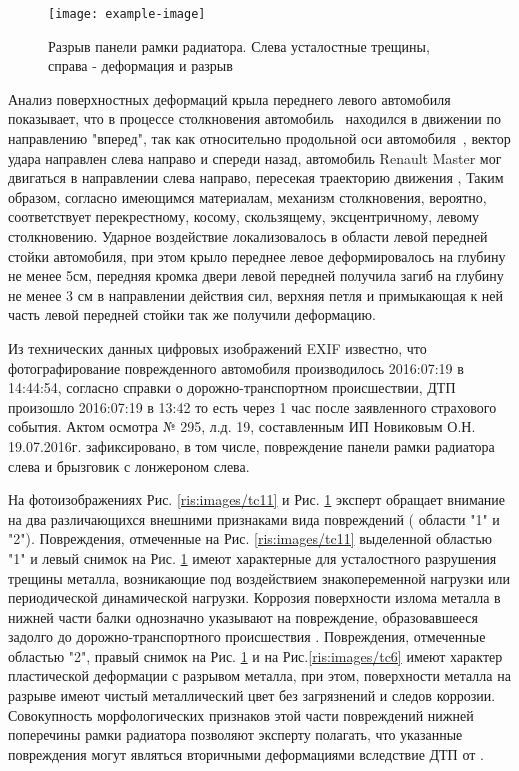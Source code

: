 \begin{figure}[H]
	\centering
	\texttt{[image: example-image]}
	\caption{{\footnotesize {Разрыв панели рамки радиатора. Слева усталостные трещины, справа - деформация и разрыв}}}
	\label{ris:images/tc12}
\end{figure}


Анализ поверхностных  деформаций крыла переднего левого  автомобиля \, показывает, что в процессе столкновения  автомобиль \, находился в движении по направлению "вперед", так как  относительно продольной оси автомобиля \,, вектор удара направлен слева направо и спереди назад, автомобиль Renault Master мог двигаться в направлении слева направо, пересекая траекторию движения , Таким образом, согласно имеющимся материалам, механизм столкновения,    вероятно, соответствует перекрестному, косому, скользящему, эксцентричному, левому столкновению.  Ударное воздействие локализовалось в области левой передней стойки автомобиля, при этом крыло переднее левое деформировалось на глубину не менее 5см, передняя  кромка двери левой передней получила загиб на глубину не менее 3 см в направлении действия сил, верхняя петля и примыкающая к ней часть левой передней стойки так же получили деформацию.  

Из технических данных  цифровых изображений EXIF известно, что 
фотографирование поврежденного автомобиля производилось  2016:07:19 в 14:44:54,  согласно справки о дорожно-транспортном происшествии, ДТП произошло 2016:07:19 в 13:42 то есть через 1 час после заявленного страхового события. Актом осмотра № 295, л.д. 19, составленным ИП Новиковым О.Н. 19.07.2016г. зафиксировано, в том числе, повреждение панели рамки радиатора слева и брызговик с лонжероном  слева.

На фотоизображениях Рис. \ref{ris:images/tc11} и Рис. \ref{ris:images/tc12} эксперт обращает внимание на два различающихся внешними признаками  вида повреждений ( области "1" и "2"). Повреждения, отмеченные на Рис. \ref{ris:images/tc11} выделенной областью "1" и левый снимок на Рис. \ref{ris:images/tc12} имеют характерные для усталостного разрушения трещины металла, возникающие под воздействием знакопеременной нагрузки или периодической динамической нагрузки. Коррозия поверхности излома металла в нижней части балки однозначно указывают на повреждение, образовавшееся задолго до дорожно-транспортного происшествия .  Повреждения, отмеченные областью "2", правый снимок на Рис.  \ref{ris:images/tc12} и на Рис.\ref{ris:images/tc6}  имеют характер пластической деформации с разрывом металла, при этом, поверхности металла на разрыве имеют чистый металлический цвет без загрязнений и следов коррозии. Совокупность морфологических признаков этой части повреждений нижней поперечины рамки радиатора позволяют эксперту полагать, что указанные повреждения могут являться вторичными деформациями вследствие ДТП от .

